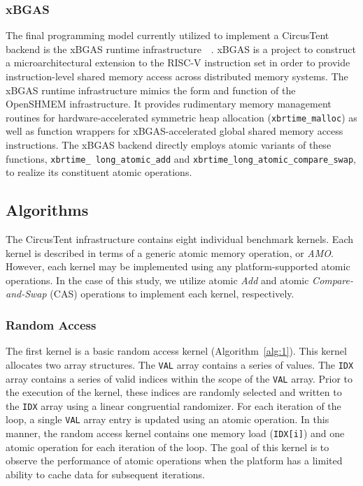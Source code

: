 \subsubsection{xBGAS}
\label{subsubsec:xbgas}
The final programming model currently utilized to implement a CircusTent backend is the xBGAS runtime infrastructure~\cite{leidel2018xbgas}~\cite{xbgasspec}.
xBGAS is a project to construct a microarchitectural extension to the RISC-V instruction set in order to provide instruction-level shared memory access across distributed memory systems.
The xBGAS runtime infrastructure mimics the form and function of the OpenSHMEM infrastructure.
It provides rudimentary memory management routines for hardware-accelerated symmetric heap allocation (\texttt{xbrtime\_malloc}) as well as function wrappers for xBGAS-accelerated global shared memory access instructions.
The xBGAS backend directly employs atomic variants of these functions, \texttt{xbrtime\_ long\_atomic\_add} and \newline \texttt{xbrtime\_long\_atomic\_compare\_swap}, to realize its constituent atomic operations.  

\subsection{Algorithms}
\label{subsec:algorithms}

The CircusTent infrastructure contains eight individual benchmark kernels.
Each kernel is described in terms of a generic atomic memory operation, or \textit{AMO}.  
However, each kernel may be implemented using any platform-supported atomic operations.
In the case of this study, we utilize atomic \textit{Add} and atomic \textit{Compare-and-Swap} (CAS) operations to implement each kernel, respectively.  

\subsubsection{Random Access}
\label{subsubsec:random_access}

The first kernel is a basic random access kernel (Algorithm~\ref{alg:1}).
This kernel allocates two array structures.
The \texttt{VAL} array contains a series of values.
The \texttt{IDX} array contains a series of valid indices within the scope of the \texttt{VAL} array.
Prior to the execution of the kernel, these indices are randomly selected and written to the \texttt{IDX} array using a linear congruential randomizer.
For each iteration of the loop, a single \texttt{VAL} array entry is updated using an atomic operation.
In this manner, the random access kernel contains one memory load (\texttt{IDX[i]}) and one atomic operation for each iteration of the loop.
The goal of this kernel is to observe the performance of atomic operations when the platform has a limited ability to cache data for subsequent iterations.  

